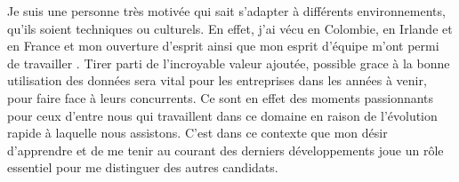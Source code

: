\documentclass[11pt, a4paper]{awesome-cv}
\begin{document}
\begin{cvletter}
\begin{comment}
I am a highly motivated person who is able to adapt to different environments, whether they be technical or cultural, having lived in Colombia, Ireland and France. The projects that I have worked on outside fundamental research have touched upon a theme that is common for many companies nowdays, namely the migration of their existing on-premise infrastructures towards the cloud. 
Leveraging the incredible value that is present within data will be vital for businesses in the coming years as it will allow them gain a competitive edge over their competitors. These are indeed exciting times for those of us who are working in this field due to the fast-paced evolution that we are witnessing. It is within this context that my eagerness to learn and stay up to date with the latest developments plays a critical role in distinguishing myself from other candidates. 
\end{comment}
Je suis une personne très motivée qui sait s'adapter à différents environnements, qu'ils soient techniques ou culturels. En effet, j'ai vécu en Colombie, en Irlande et en France et mon ouverture d'esprit ainsi que mon esprit d'équipe m'ont permi de travailler . 
Tirer parti de l'incroyable valeur ajoutée, possible grace à la bonne utilisation des données sera vital pour les entreprises dans les années à venir, pour faire face à leurs concurrents. 
Ce sont en effet des moments passionnants pour ceux d'entre nous qui travaillent dans ce domaine en raison de l'évolution rapide à laquelle nous assistons. 
C'est dans ce contexte que mon désir d'apprendre et de me tenir au courant des derniers développements joue un rôle essentiel pour me distinguer des autres candidats.
\
\end{cvletter}

\makeletterclosing
\end{document}
